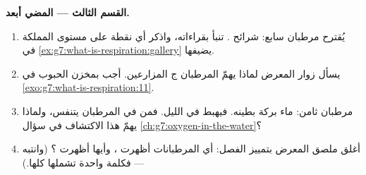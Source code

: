 \begin{problem}
\medskip\noindent\textbf{القسم الثالث --- المضي أبعد.}
\begin{enumerate}[resume]
  \item يُقترح مرطبان سابع: شرائح . تنبأ بقراءاته، واذكر أي
        نقطة على مستوى المملكة في
        \cref{ex:g7:what-is-respiration:gallery} يضيفها.
  \item يسأل زوار المعرض لماذا يهمّ المرطبان ج المزارعين. أجب
        بمخزن الحبوب في \cref{exo:g7:what-is-respiration:11}.
  \item مرطبان ثامن: ماء بركة بطينه. فيهبط  في الليل.
        فمن في المرطبان يتنفس، ولماذا يهمّ هذا الاكتشاف في سؤال
        \cref{ch:g7:oxygen-in-the-water}؟
  \item أغلق ملصق المعرض بتمييز الفصل: أي المرطبانات أظهرت
        \emph{}، وأيها أظهرت \emph{}؟
        (وانتبه --- فكلمة واحدة تشملها كلها.)
\end{enumerate}
\end{problem}
